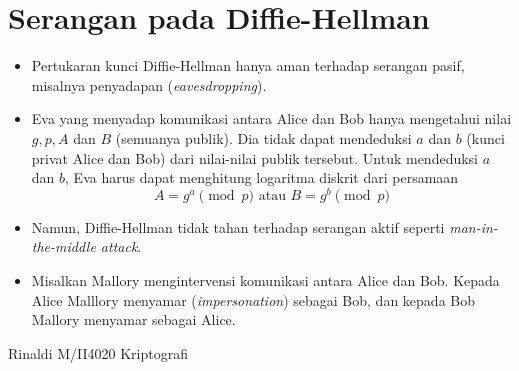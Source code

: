 \documentclass{article}
\begin{document}

\section*{Serangan pada Diffie-Hellman}

\begin{itemize}
    \item Pertukaran kunci Diffie-Hellman hanya aman terhadap serangan pasif, misalnya penyadapan (\textit{eavesdropping}).
    \item Eva yang menyadap komunikasi antara Alice dan Bob hanya mengetahui nilai $g, p, A$ dan $B$ (semuanya publik). Dia tidak dapat mendeduksi $a$ dan $b$ (kunci privat Alice dan Bob) dari nilai-nilai publik tersebut. Untuk mendeduksi $a$ dan $b$, Eva harus dapat menghitung logaritma diskrit dari persamaan
    \[ A = g^a \pmod{p} \text{ atau } B = g^b \pmod{p} \]
    \item Namun, Diffie-Hellman tidak tahan terhadap serangan aktif seperti \textit{man-in-the-middle attack}.
    \item Misalkan Mallory mengintervensi komunikasi antara Alice dan Bob. Kepada Alice Malllory menyamar (\textit{impersonation}) sebagai Bob, dan kepada Bob Mallory menyamar sebagai Alice.
\end{itemize}

\vfill
\begin{center}
    Rinaldi M/II4020 Kriptografi
\end{center}
\end{document}
